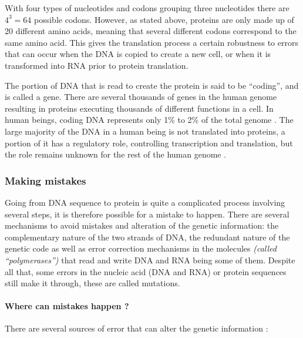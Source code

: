 \documentclass[
  11pt,
  twoside,
  BCOR=10mm,
  listof=totoc]{scrbook}
\begin{document}
With four types of nucleotides and codons grouping three nucleotides there are \(4^3=64\) possible codons. However, as stated above, proteins are only made up of 20 different amino acids, meaning that several different codons correspond to the same amino acid. This gives the translation process a certain robustness to errors that can occur when the DNA is copied to create a new cell, or when it is transformed into RNA prior to protein translation.

The portion of DNA that is read to create the protein is said to be ``coding'', and is called a gene. There are several thousands of genes in the human genome \autocite{internationalhumangenomesequencingconsortiumFinishingEuchromaticSequence2004} resulting in proteins executing thousands of different functions in a cell. In human beings, coding DNA represents only 1\% to 2\% of the total genome \autocite{elkonCharacterizationNoncodingRegulatory2017,omennReflectionsHUPOHuman2021}. The large majority of the DNA in a human being is not translated into proteins, a portion of it has a regulatory role, controlling transcription and translation, but the role remains unknown for the rest of the human genome \autocite{shabalinaMammalianTranscriptomeFunction2004,IntegratedEncyclopediaDNA2012}.

\hypertarget{making-mistakes}{%
\subsubsection{Making mistakes}\label{making-mistakes}}

Going from DNA sequence to protein is quite a complicated process involving several steps, it is therefore possible for a mistake to happen. There are several mechanisms to avoid mistakes and alteration of the genetic information: the complementary nature of the two strands of DNA, the redundant nature of the genetic code as well as error correction mechanisms in the molecules \emph{(called ``polymerases'')} that read and write DNA and RNA being some of them. Despite all that, some errors in the nucleic acid (DNA and RNA) or protein sequences still make it through, these are called mutations.

\hypertarget{where-can-mistakes-happen}{%
\paragraph{Where can mistakes happen ?}\label{where-can-mistakes-happen}}

There are several sources of error that can alter the genetic information \autocite{chatterjee2017}:
\end{document}
